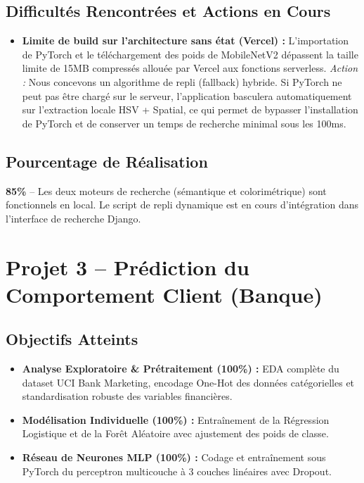 \documentclass[12pt,a4paper]{article}
\begin{document}
\subsection{Difficultés Rencontrées et Actions en Cours}
\begin{itemize}
    \item \textbf{Limite de build sur l'architecture sans état (Vercel) :} L'importation de PyTorch et le téléchargement des poids de MobileNetV2 dépassent la taille limite de 15MB compressés allouée par Vercel aux fonctions serverless.
    \textit{Action :} Nous concevons un algorithme de repli (fallback) hybride. Si PyTorch ne peut pas être chargé sur le serveur, l'application basculera automatiquement sur l'extraction locale HSV + Spatial, ce qui permet de bypasser l'installation de PyTorch et de conserver un temps de recherche minimal sous les 100ms.
\end{itemize}

\subsection{Pourcentage de Réalisation}
\textbf{85\%} -- Les deux moteurs de recherche (sémantique et colorimétrique) sont fonctionnels en local. Le script de repli dynamique est en cours d'intégration dans l'interface de recherche Django.

\newpage

\section{Projet 3 -- Prédiction du Comportement Client (Banque)}

\subsection{Objectifs Atteints}
\begin{itemize}
    \item \textbf{Analyse Exploratoire \& Prétraitement (100\%) :} EDA complète du dataset UCI Bank Marketing, encodage One-Hot des données catégorielles et standardisation robuste des variables financières.
    \item \textbf{Modélisation Individuelle (100\%) :} Entraînement de la Régression Logistique et de la Forêt Aléatoire avec ajustement des poids de classe.
    \item \textbf{Réseau de Neurones MLP (100\%) :} Codage et entraînement sous PyTorch du perceptron multicouche à 3 couches linéaires avec Dropout.
\end{itemize}
\end{document}
